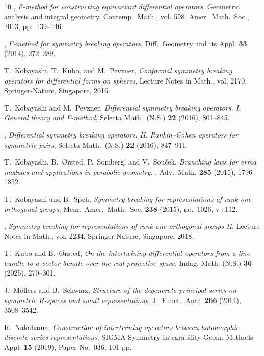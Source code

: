 \documentclass[reqno,11pt]{amsart}
\theoremstyle{remark}
\theoremstyle{definition}
\numberwithin{equation}{section}
\begin{document}
\begin{thebibliography}{10}
\bysame, \emph{{F-method for constructing equivariant differential operators}},
  Geometric analysis and integral geometry, Contemp.\ Math., vol. 598, Amer.\
  Math.\ Soc., 2013, pp.~139--146.

\bysame, \emph{{F-method for symmetry breaking operators}}, Diff.\ Geometry and
  its Appl. \textbf{33} (2014), 272--289.

T.~Kobayashi, T.~Kubo, and M.~Pevzner, \emph{Conformal symmetry breaking
  operators for differential forms on spheres}, Lecture Notes in Math., vol.
  2170, Springer-Nature, Singapore, 2016.

T.~Kobayashi and M.~Pevzner, \emph{Differential symmetry breaking operators.
  {I}. {G}eneral theory and {F}-method}, Selecta Math.~(N.S.) \textbf{22}
  (2016), 801--845.

\bysame, \emph{Differential symmetry breaking operators. {II}.
  {R}ankin--{C}ohen operators for symmetric pairs}, Selecta Math.~(N.S.)
  \textbf{22} (2016), 847--911.

T.~Kobayashi, B.~\O rsted, P.~Somberg, and V.~Sou\v cek, \emph{Branching laws
  for \text{V}erma modules and applications in parabolic geometry. \text{I}},
  Adv.~Math. \textbf{285} (2015), 1796--1852.

T.~Kobayashi and B.~Speh, \emph{{Symmetry breaking for representations of rank
  one orthogonal groups}}, Mem.~Amer.~Math.~Soc. \textbf{238} (2015), no.~1026,
  v+112.

\bysame, \emph{{Symmetry breaking for representations of rank one orthogonal
  groups II}}, Lecture Notes in Math., vol. 2234, Springer-Nature, Singapore,
  2018.

T.~Kubo and B.~\O rsted, \emph{{On the intertwining differential operators from
  a line bundle to a vector bundle over the real projective space}}, 
   Indag. Math. (N.S.)
  \textbf{36} (2025), 270--301. 

J.~M{\"o}llers and B.~Schwarz, \emph{{Structure of the degenerate principal
  series on symmetric $R$-spaces and small representations}}, J.\ Funct.\ Anal.
  \textbf{266} (2014), 3508--3542.

R.~Nakahama, \emph{{Construction of intertwining operators between holomorphic
  discrete series representations}}, SIGMA Symmetry Integrability Geom. Methods
  Appl. \textbf{15} (2019), Paper No.\ 036, 101 pp.


\end{thebibliography}
\end{document}
